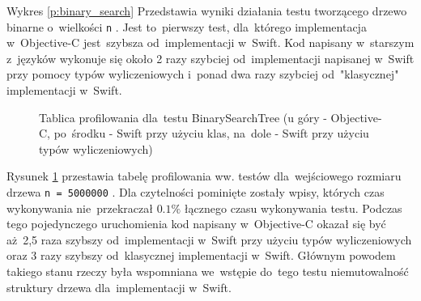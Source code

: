 \documentclass[mgr, shortabstract]{iithesis}
\newcommand{\swiftinline}[1]{
    \texttt{#1}
}
\begin{document}
Wykres \ref{p:binary_search} Przedstawia wyniki działania testu tworzącego drzewo binarne o~wielkości \swiftinline{n}. Jest to~pierwszy test, dla~którego implementacja w~Objective-C jest~szybsza od~implementacji w~Swift. Kod napisany w~starszym z~języków wykonuje się około 2 razy szybciej od~implementacji napisanej w~Swift przy pomocy typów wyliczeniowych i~ponad dwa razy szybciej od~"klasycznej" implementacji w~Swift. 

\begin{figure}
    \caption{Tablica profilowania dla~testu BinarySearchTree (u góry - Objective-C, po~środku - Swift przy użyciu klas, na~dole - Swift przy użyciu typów wyliczeniowych)}
    \label{i:binary_search}
\end{figure}

Rysunek \ref{i:binary_search} przestawia tabelę profilowania ww. testów dla~wejściowego rozmiaru drzewa \swiftinline{n = 5000000}. Dla czytelności pominięte zostały wpisy, których czas wykonywania nie~przekraczał $0.1\%$ łącznego czasu wykonywania testu. Podczas tego pojedynczego uruchomienia kod napisany w~Objective-C okazał się być aż~2,5 raza szybszy od~implementacji w~Swift przy użyciu typów wyliczeniowych oraz 3 razy szybszy od~klasycznej implementacji w~Swift. Głównym powodem takiego stanu rzeczy była wspomniana we~wstępie do~tego testu niemutowalność struktury drzewa dla~implementacji w~Swift. 
\end{document}
